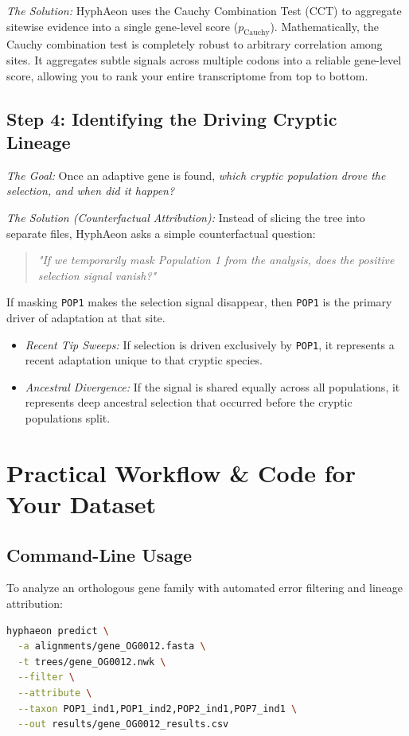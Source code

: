 \documentclass[11pt,a4paper]{article}
\begin{document}
\textit{The Solution:} HyphAeon uses the Cauchy Combination Test (CCT) to aggregate sitewise evidence into a single gene-level score ($p_{\text{Cauchy}}$). Mathematically, the Cauchy combination test is completely robust to arbitrary correlation among sites. It aggregates subtle signals across multiple codons into a reliable gene-level score, allowing you to rank your entire transcriptome from top to bottom.

\subsection{Step 4: Identifying the Driving Cryptic Lineage}
\textit{The Goal:} Once an adaptive gene is found, \textit{which cryptic population drove the selection, and when did it happen?}

\textit{The Solution (Counterfactual Attribution):} Instead of slicing the tree into separate files, HyphAeon asks a simple counterfactual question:
\begin{quote}
\textit{"If we temporarily mask Population 1 from the analysis, does the positive selection signal vanish?"}
\end{quote}
If masking \texttt{POP1} makes the selection signal disappear, then \texttt{POP1} is the primary driver of adaptation at that site.
\begin{itemize}
    \item \textit{Recent Tip Sweeps:} If selection is driven exclusively by \texttt{POP1}, it represents a recent adaptation unique to that cryptic species.
    \item \textit{Ancestral Divergence:} If the signal is shared equally across all populations, it represents deep ancestral selection that occurred before the cryptic populations split.
\end{itemize}

\section{Practical Workflow \& Code for Your Dataset}

\subsection{Command-Line Usage}
To analyze an orthologous gene family with automated error filtering and lineage attribution:
\begin{lstlisting}[language=bash]
hyphaeon predict \
  -a alignments/gene_OG0012.fasta \
  -t trees/gene_OG0012.nwk \
  --filter \
  --attribute \
  --taxon POP1_ind1,POP1_ind2,POP2_ind1,POP7_ind1 \
  --out results/gene_OG0012_results.csv
\end{lstlisting}
\end{document}
